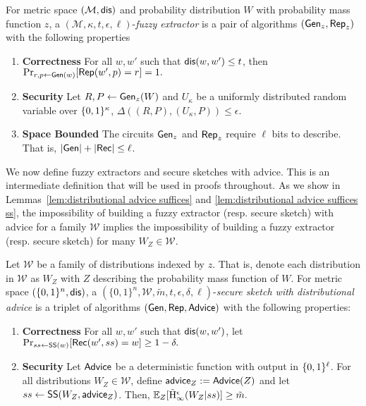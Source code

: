 \begin{definition}
For metric space $(\mathcal{M}, \mathsf{dis})$ and probability distribution $W$ with probability mass function $z$, a $(\mathcal{M}, \kappa, t, \epsilon, \ell)$-\emph{fuzzy extractor} is a pair of algorithms $({\mathsf{Gen}}_z, {\mathsf{Rep}}_z)$ with the following properties 
\begin{enumerate} 
\itemsep0em
\item \textbf{Correctness} For all $w, w'$ such that $\mathsf{dis}(w, w')\le t$, then 
$\Pr_{r, p \leftarrow {\ensuremath{\mathsf{Gen}}}(w)}[{\mathsf{Rep}}(w', p) = r]=1.$ 
\item \textbf{Security} Let $R, P \leftarrow {\ensuremath{\mathsf{Gen}}}_z(W)$ and $U_\kappa$ be a uniformly distributed random variable over $\{0, 1\}^\kappa$, $\Delta((R, P), (U_\kappa, P))\le \epsilon.$
\item  \textbf{Space Bounded} The circuits ${\mathsf{Gen}}_z$ and ${\mathsf{Rep}}_z$ require $\ell$ bits to describe.  That is, $|{\mathsf{Gen}}| +|{\mathsf{Rec}}|\le \ell$.
\end{enumerate}
\label{def:fe}
\end{definition}

\noindent
We now define fuzzy extractors and secure sketches with advice.  This is an intermediate definition that will be used in proofs throughout.  As we show in Lemmas~\ref{lem:distributional advice suffices} and \ref{lem:distributional advice suffices ss}, the impossibility of building a fuzzy extractor (resp. secure sketch) with advice for a family $\mathcal{W}$ implies the impossibility of building a fuzzy extractor (resp. secure sketch) for many $W_Z\in\mathcal{W}$.

\begin{definition}
\label{def:ss distributional}
Let $\mathcal{W}$ be a family of distributions indexed by $z$.  That is, denote each distribution in $\mathcal{W}$ as $W_Z$ with $Z$ describing the probability mass function of $W$.  
For metric space $(\{0,1\}^n, \mathsf{dis})$, a $(\{0,1\}^n, \mathcal{W}, \tilde{m}, t, \epsilon, \delta, \ell)$-\emph{secure sketch with distributional advice} is a triplet of algorithms $({\mathsf{Gen}}, {\mathsf{Rep}}, {\mathsf{Advice}})$ with the following properties:
\begin{enumerate} 
\itemsep0em
\item \textbf{Correctness} For all $w, w'$ such that $\mathsf{dis}(w, w')$, let $\Pr_{ss \leftarrow {\ensuremath{\mathsf{SS}}}(w)}[{\mathsf{Rec}}(w', ss) = w]\ge 1-\delta.$
\item \textbf{Security} Let ${\mathsf{Advice}}$ be a deterministic function with output in $\{0, 1\}^\ell$.  For all distributions $W_Z \in \mathcal{W}$, define ${\mathsf{advice}}_Z:= {\mathsf{Advice}}(Z)$ and let $ss \leftarrow {\ensuremath{\mathsf{SS}}}(W_Z, {\mathsf{advice}}_Z)$. Then,
$
\operatorname*{\mathbb{E}}_{Z} [\tilde{\mathrm{H}}_\infty^\epsilon(W_Z| ss)] \ge \tilde{m}.
$
\end{enumerate}
\end{definition}


